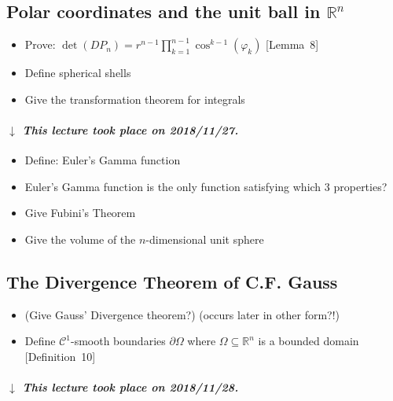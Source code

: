\documentclass{article}
\numberwithin{lecref}{section}
\newcommand{\dateref}[1]{%
  \begin{mdframed}[backgroundcolor=gray!10,innerbottommargin=0pt,innertopmargin=0pt]
    \paragraph{\textit{$\downarrow$ This lecture took place on #1.}}%
  \end{mdframed}%
}
\begin{document}
\subsection*{Polar coordinates and the unit ball in $\mathbb R^n$}

\begin{itemize}
  \item Prove: $\det(DP_n) = r^{n-1} \prod_{k=1}^{n-1} \cos^{k-1}(\varphi_k)$ [Lemma~8]
  \item Define spherical shells
  \item Give the transformation theorem for integrals
\end{itemize}

\dateref{2018/11/27}

\begin{itemize}
  \item Define: Euler's Gamma function
  \item Euler's Gamma function is the only function satisfying which 3 properties?
  \item Give Fubini's Theorem
  \item Give the volume of the $n$-dimensional unit sphere
\end{itemize}

\subsection*{The Divergence Theorem of C.F. Gauss}

\begin{itemize}
  \item (Give Gauss' Divergence theorem?) (occurs later in other form?!)
  \item Define $\mathcal C^1$-smooth boundaries $\partial \Omega$ where $\Omega \subseteq \mathbb R^n$ is a bounded domain [Definition~10]
\end{itemize}

\dateref{2018/11/28}
\end{document}
